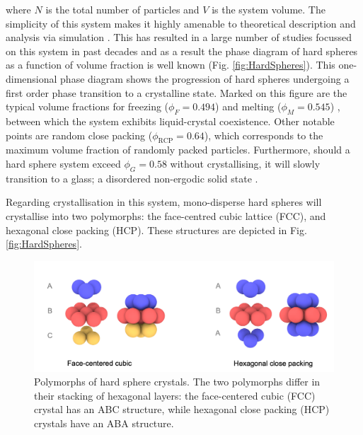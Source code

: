 \noindent where $N$ is the total number of particles and $V$ is the system volume. The simplicity of this system makes it highly amenable to theoretical description and analysis via simulation \cite{boublik1970,rintoul1996}. This has resulted in a large number of studies focussed on this system in past decades and as a result the phase diagram of hard spheres as a function of volume fraction is well known \cite{hoover1968} (Fig. \ref{fig:HardSpheres}). 
This one-dimensional phase diagram shows the progression of hard spheres undergoing a first order phase transition to a crystalline state. Marked on this figure are the typical volume fractions for freezing ($\phi_F = 0.494$) and melting ($\phi_M = 0.545$) \cite{hoover1968}, between which the system exhibits liquid-crystal coexistence. Other notable points are random close packing ($\phi_{\textrm{RCP}} = 0.64$), which corresponds to the maximum volume fraction of randomly packed particles. Furthermore, should a hard sphere system exceed $\phi_G =  0.58$ without crystallising, it will slowly transition to a glass; a disordered non-ergodic solid state \cite{palberg2016}.



Regarding crystallisation in this system, mono-disperse hard spheres will crystallise into two polymorphs: the face-centred cubic lattice (FCC), and hexagonal close packing (HCP). These structures are depicted in Fig. \ref{fig:HardSpheres}. 


\begin{figure}
	\includegraphics[width=\linewidth]{chapters/colloids/figsColloids/figFCCvsHCP.png}
	\caption[Polymorphs of hard sphere crystals]{Polymorphs of hard sphere crystals. The two polymorphs differ in their stacking of hexagonal layers: the face-centered cubic (FCC) crystal has an ABC structure, while hexagonal close packing (HCP) crystals have an ABA structure.}
	\label{fig:FCCvsHCP}
\end{figure}

